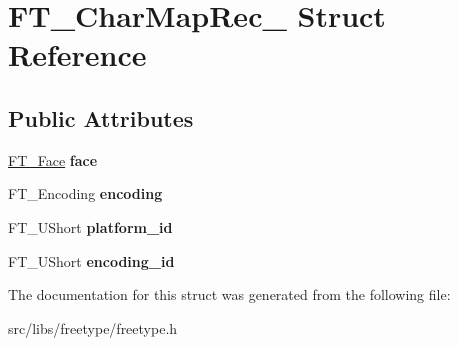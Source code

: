 \hypertarget{struct_f_t___char_map_rec__}{
\section{FT\_\-CharMapRec\_\- Struct Reference}
\label{struct_f_t___char_map_rec__}
}
\subsection*{Public Attributes}
\begin{DoxyCompactItemize}
\item 
\hypertarget{struct_f_t___char_map_rec___a70a4e53e3f9818209916e5745c46dc28}{
\hyperlink{struct_f_t___face_rec__}{FT\_\-Face} {\bfseries face}}
\label{struct_f_t___char_map_rec___a70a4e53e3f9818209916e5745c46dc28}

\item 
\hypertarget{struct_f_t___char_map_rec___a88ee6f726ef11a8e6cc793d59ff5557e}{
FT\_\-Encoding {\bfseries encoding}}
\label{struct_f_t___char_map_rec___a88ee6f726ef11a8e6cc793d59ff5557e}

\item 
\hypertarget{struct_f_t___char_map_rec___ae7f439996a8615698e780ce3c4f92457}{
FT\_\-UShort {\bfseries platform\_\-id}}
\label{struct_f_t___char_map_rec___ae7f439996a8615698e780ce3c4f92457}

\item 
\hypertarget{struct_f_t___char_map_rec___af10dd43eee8dc93e7d6191c663ae831a}{
FT\_\-UShort {\bfseries encoding\_\-id}}
\label{struct_f_t___char_map_rec___af10dd43eee8dc93e7d6191c663ae831a}

\end{DoxyCompactItemize}


The documentation for this struct was generated from the following file:\begin{DoxyCompactItemize}
\item 
src/libs/freetype/freetype.h\end{DoxyCompactItemize}
